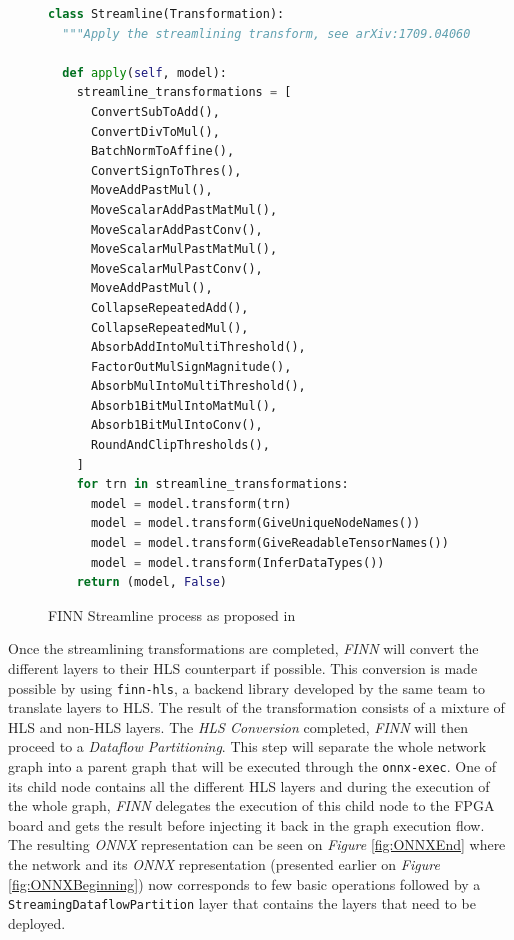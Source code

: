 \begin{figure}[htbp]
\centering
\begin{lstlisting}[language=Python]
class Streamline(Transformation):
  """Apply the streamlining transform, see arXiv:1709.04060."""

  def apply(self, model):
    streamline_transformations = [
      ConvertSubToAdd(),
      ConvertDivToMul(),
      BatchNormToAffine(),
      ConvertSignToThres(),
      MoveAddPastMul(),
      MoveScalarAddPastMatMul(),
      MoveScalarAddPastConv(),
      MoveScalarMulPastMatMul(),
      MoveScalarMulPastConv(),
      MoveAddPastMul(),
      CollapseRepeatedAdd(),
      CollapseRepeatedMul(),
      AbsorbAddIntoMultiThreshold(),
      FactorOutMulSignMagnitude(),
      AbsorbMulIntoMultiThreshold(),
      Absorb1BitMulIntoMatMul(),
      Absorb1BitMulIntoConv(),
      RoundAndClipThresholds(),
    ]
    for trn in streamline_transformations:
      model = model.transform(trn)
      model = model.transform(GiveUniqueNodeNames())
      model = model.transform(GiveReadableTensorNames())
      model = model.transform(InferDataTypes())
    return (model, False)
\end{lstlisting}
\caption[FINN Streamline]{FINN Streamline process as proposed in \cite{Umuroglu2017b, Blott2018}}
	\label{fig:FINNStreamline}
\end{figure}

\newpage

Once the streamlining transformations are completed, \emph{FINN} will convert the different layers to their HLS counterpart if possible. This conversion is made possible by using \texttt{finn-hls}, a backend library developed by the same team to translate layers to HLS. The result of the transformation consists of a mixture of HLS and non-HLS layers. The \emph{HLS Conversion} completed, \emph{FINN} will then proceed to a \emph{Dataflow Partitioning}. This step will separate the whole network graph into a parent graph that will be executed through the \texttt{onnx-exec}. One of its child node contains all the different HLS layers and during the execution of the whole graph, \emph{FINN} delegates the execution of this child node to the FPGA board and gets the result before injecting it back in the graph execution flow. The resulting \emph{ONNX} representation can be seen on \emph{Figure} \ref{fig:ONNXEnd} where the network and its \emph{ONNX} representation (presented earlier on \emph{Figure} \ref{fig:ONNXBeginning}) now corresponds to few basic operations followed by a \texttt{StreamingDataflowPartition} layer that contains the layers that need to be deployed.

